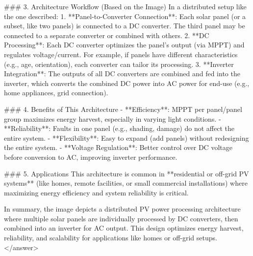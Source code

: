 ### 3. Architecture Workflow (Based on the Image)  
In a distributed setup like the one described:  
1. **Panel-to-Converter Connection**: Each solar panel (or a subset, like two panels) is connected to a DC converter. The third panel may be connected to a separate converter or combined with others.  
2. **DC Processing**: Each DC converter optimizes the panel’s output (via MPPT) and regulates voltage/current. For example, if panels have different characteristics (e.g., age, orientation), each converter can tailor its processing.  
3. **Inverter Integration**: The outputs of all DC converters are combined and fed into the inverter, which converts the combined DC power into AC power for end-use (e.g., home appliances, grid connection).  


### 4. Benefits of This Architecture  
- **Efficiency**: MPPT per panel/panel group maximizes energy harvest, especially in varying light conditions.  
- **Reliability**: Faults in one panel (e.g., shading, damage) do not affect the entire system.  
- **Flexibility**: Easy to expand (add panels) without redesigning the entire system.  
- **Voltage Regulation**: Better control over DC voltage before conversion to AC, improving inverter performance.  


### 5. Applications  
This architecture is common in **residential or off-grid PV systems** (like homes, remote facilities, or small commercial installations) where maximizing energy efficiency and system reliability is critical.  


In summary, the image depicts a distributed PV power processing architecture where multiple solar panels are individually processed by DC converters, then combined into an inverter for AC output. This design optimizes energy harvest, reliability, and scalability for applications like homes or off-grid setups.</answer>